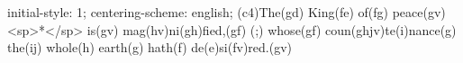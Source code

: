 initial-style: 1;
centering-scheme: english;
(c4)The(gd) King(fe) of(fg) peace(gv) <sp>*</sp> is(gv) mag(hv)ni(gh)fied,(gf) (;) whose(gf) coun(ghjv)te(i)nance(g) the(ij) whole(h) earth(g) hath(f) de(e)si(fv)red.(gv)
